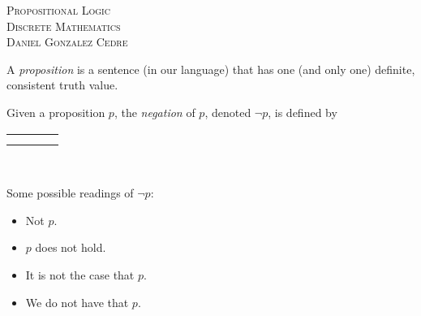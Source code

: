 




\begin{center}
    \textsc{\huge Propositional Logic}\\
    \textsc{\large Discrete Mathematics}\\
    \textsc{Daniel Gonzalez Cedre}
\end{center}

\begin{definition}[Proposition]
    A \emph{proposition} is a sentence (in our language)
    that has one (and only one) definite, consistent truth value.
\end{definition}

\begin{definition}[Negation]
    \begin{center}
        \begin{minipage}[t]{.55\linewidth}
            Given a proposition $p$, the \emph{negation} of $p$,
            denoted $\neg p$, is defined by
            \begin{table}[H]
                \centering
                \label{tab:not}
                \begin{tabular}{|Cc||Cc|}
                    \hline
                     &  \\ \hline
                    \thead{$\top$} &  \\
                    \thead{$\bot$} &  \\ \hline
                \end{tabular}
            \end{table}
        \end{minipage}%
        \begin{minipage}[t]{.05\linewidth}
            ~
        \end{minipage}%
        \begin{minipage}[t]{.4\linewidth}
            Some possible readings of $\neg p$:\\
            \begin{itemize}
                \item[\cdot]
                    Not $p$.
                \item[\cdot]
                    $p$ does not hold.
                \item[\cdot]
                    It is not the case that $p$.
                \item[\cdot]
                    We do not have that $p$.
            \end{itemize}
        \end{minipage}
    \end{center}
\end{definition}

